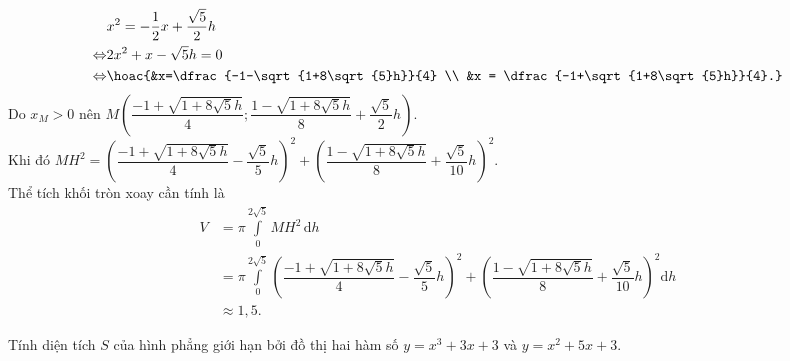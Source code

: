 \begin{ex}
{\begin{align*}
			&x^2 = -\dfrac{1}{2}x + \dfrac{\sqrt{5}}{2}h \\
			\Leftrightarrow&2x^2 + x - \sqrt{5}h = 0 \\
			\Leftrightarrow& \hoac{&x=\dfrac{-1-\sqrt{1+8\sqrt{5}h}}{4} \\ &x = \dfrac{-1+\sqrt{1+8\sqrt{5}h}}{4}.}
		\end{align*}
		Do $x_M>0$ nên $M\left(\dfrac{-1+\sqrt{1+8\sqrt{5}h}}{4};\dfrac{1-\sqrt{1+8\sqrt{5}h}}{8}+\dfrac{\sqrt{5}}{2}h\right)$. \\
		Khi đó $MH^2 = \left(\dfrac{-1+\sqrt{1+8\sqrt{5}h}}{4}-\dfrac{\sqrt{5}}{5}h\right)^2 + \left(\dfrac{1-\sqrt{1+8\sqrt{5}h}}{8}+\dfrac{\sqrt{5}}{10}h\right)^2$. \\
		Thể tích khối tròn xoay cần tính là
		\allowdisplaybreaks
		\begin{align*}
			V &= \displaystyle \pi\int\limits_{0}^{2\sqrt{5}}MH^2\mathrm{\,d}h \\
			&= \displaystyle \pi\int\limits_{0}^{2\sqrt{5}}\left(\dfrac{-1+\sqrt{1+8\sqrt{5}h}}{4}-\dfrac{\sqrt{5}}{5}h\right)^2 + \left(\dfrac{1-\sqrt{1+8\sqrt{5}h}}{8}+\dfrac{\sqrt{5}}{10}h\right)^2\mathrm{d}h \\
			&\approx 1{,}5.
		\end{align*}
	}
\end{ex}

\begin{bt}%
	Tính diện tích $S$ của hình phẳng giới hạn bởi đồ thị hai hàm số $y=x^3 +3x+3$ và $y=x^2+5x+3$.
\end{bt}

